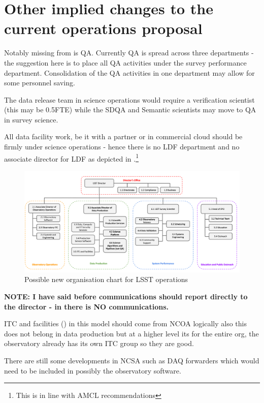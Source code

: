 


\section{Other implied changes to the current operations proposal}
Notably missing from  is \gls{QA}. Currently \gls{QA} is spread across  three
 departments - the suggestion here is to place all \gls{QA} activities under the survey performance department. Consolidation
of the \gls{QA} activities in one department may allow for some personnel saving.

The data release team in science operations would require a verification scientist (this may be 0.5FTE) while the \gls{SDQA} and Semantic scientists may move to QA in survey science.

All data facility work, be it with a partner or in commercial \gls{cloud} should be firmly under science operations - hence there is no LDF department and no associate director for LDF as depicted in .\footnote{This is  in line with AMCL recommendations}


\begin{figure}
\includegraphics[width=1.0\textwidth]{figures/OpsOrg}
\caption{Possible new organisation chart for \gls{LSST}  operations \label{fig:opsorg}}
\end{figure}

\textbf{NOTE: I have said before communications should report directly to the director - in  there is NO communications.}

ITC and facilities () in this model should come from NCOA  logically also this does not belong in data production but at a higher level its for the entire org, the observatory already has its own ITC group so they are good.


There are still some developments in NCSA such as DAQ forwarders which would need to be included in possibly the observatory software.
